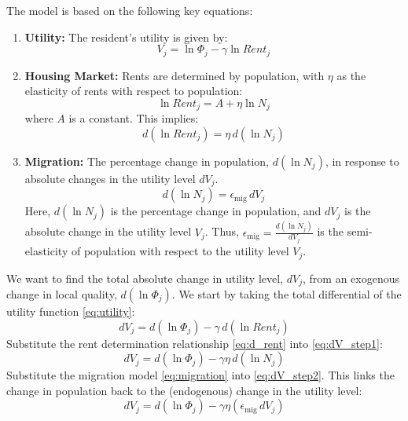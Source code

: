 \documentclass[11pt]{article}
\begin{document}
The model is based on the following key equations:

\begin{enumerate}
    \item \textbf{Utility:} The resident's utility is given by:
    \begin{equation}
        V_j = \ln \Phi_j - \gamma \ln Rent_j \label{eq:utility}
    \end{equation}

    \item \textbf{Housing Market:} Rents are determined by population, with $\eta$ as the elasticity of rents with respect to population:
    \begin{equation}
        \ln Rent_j = A + \eta \ln N_j \label{eq:rent}
    \end{equation}
    where $A$ is a constant. This implies:
    \begin{equation}
        d(\ln Rent_j) = \eta \, d(\ln N_j) \label{eq:d_rent}
    \end{equation}

    \item \textbf{Migration:} The percentage change in population, $d(\ln N_j)$, in response to absolute changes in the utility level $dV_j$.
    \begin{equation}
        d(\ln N_j) = \epsilon_{\text{mig}} \, dV_j \label{eq:migration}
    \end{equation}
    Here, $d(\ln N_j)$ is the percentage change in population, and $dV_j$ is the absolute change in the utility level $V_j$. Thus, $\epsilon_{\text{mig}} = \frac{d(\ln N_j)}{dV_j}$ is the semi-elasticity of population with respect to the utility level $V_j$.
\end{enumerate}

We want to find the total absolute change in utility level, $dV_j$, from an exogenous change in local quality, $d(\ln \Phi_j)$. We start by taking the total differential of the utility function \eqref{eq:utility}:
\begin{equation}
    dV_j = d(\ln \Phi_j) - \gamma \, d(\ln Rent_j) \label{eq:dV_step1}
\end{equation}
Substitute the rent determination relationship \eqref{eq:d_rent} into \eqref{eq:dV_step1}:
\begin{equation}
    dV_j = d(\ln \Phi_j) - \gamma \eta \, d(\ln N_j) \label{eq:dV_step2}
\end{equation}
Substitute the migration model \eqref{eq:migration} into \eqref{eq:dV_step2}. This links the change in population back to the (endogenous) change in the utility level:
\begin{equation}
    dV_j = d(\ln \Phi_j) - \gamma \eta \left( \epsilon_{\text{mig}} \, dV_j \right) \label{eq:dV_step3}
\end{equation}
\end{document}
